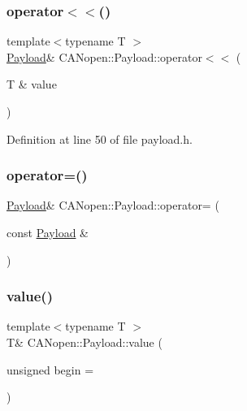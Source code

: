 \subsubsection{\texorpdfstring{operator$<$$<$()}{operator<<()}}
{\footnotesize\ttfamily template$<$typename T $>$ \\
\hyperlink{class_c_a_nopen_1_1_payload}{Payload}\& C\+A\+Nopen\+::\+Payload\+::operator$<$$<$ (\begin{DoxyParamCaption}\item[{T \&}]{value }\end{DoxyParamCaption})\hspace{0.3cm}{\ttfamily [inline]}}



Definition at line 50 of file payload.\+h.

\mbox{\label{class_c_a_nopen_1_1_payload_a646541a9ec787a3fcdbbcba153e8553c}} 
\subsubsection{\texorpdfstring{operator=()}{operator=()}}
{\footnotesize\ttfamily \hyperlink{class_c_a_nopen_1_1_payload}{Payload}\& C\+A\+Nopen\+::\+Payload\+::operator= (\begin{DoxyParamCaption}\item[{const \hyperlink{class_c_a_nopen_1_1_payload}{Payload} \&}]{ }\end{DoxyParamCaption})\hspace{0.3cm}{\ttfamily [default]}}

\mbox{\label{class_c_a_nopen_1_1_payload_aef05ef8cfc8b9ba4170891f3168a726b}} 
\subsubsection{\texorpdfstring{value()}{value()}}
{\footnotesize\ttfamily template$<$typename T $>$ \\
T\& C\+A\+Nopen\+::\+Payload\+::value (\begin{DoxyParamCaption}\item[{unsigned}]{begin = {} }\end{DoxyParamCaption})\hspace{0.3cm}{\ttfamily [inline]}}



